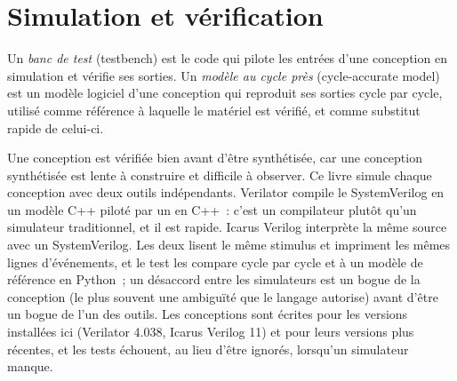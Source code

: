 \label{lst:nw:programmable-hardware-i-architecture-and-toolchain:cmp}

\section{Simulation et vérification}

\begin{definition}\label{def:nw:programmable-hardware-i-architecture-and-toolchain:tb}
Un \emph{banc de test} (testbench) est le code qui pilote les entrées d'une conception en simulation et vérifie ses sorties. Un \emph{modèle au cycle
près} (cycle-accurate model) est un modèle logiciel d'une conception qui reproduit ses sorties cycle par cycle, utilisé comme référence
à laquelle le matériel est vérifié, et comme substitut rapide de celui-ci.
\end{definition}

Une conception est vérifiée bien avant d'être synthétisée, car une conception synthétisée est lente à construire et difficile à observer. Ce livre
simule chaque conception avec deux outils indépendants. Verilator compile le SystemVerilog en un modèle C++ piloté par un  en C++~: c'est
un compilateur plutôt qu'un simulateur traditionnel, et il est rapide. Icarus Verilog interprète la même source avec un  SystemVerilog. Les
deux  lisent le même stimulus et impriment les mêmes lignes d'événements, et le test les compare cycle par cycle et à un modèle de référence en Python~;
un désaccord entre les simulateurs est un bogue de la conception (le plus souvent une ambiguïté que le langage autorise) avant d'être un bogue
de l'un des outils. Les conceptions sont écrites pour les versions installées ici (Verilator 4.038, Icarus Verilog 11) et pour leurs versions plus récentes,
et les tests échouent, au lieu d'être ignorés, lorsqu'un simulateur manque.


